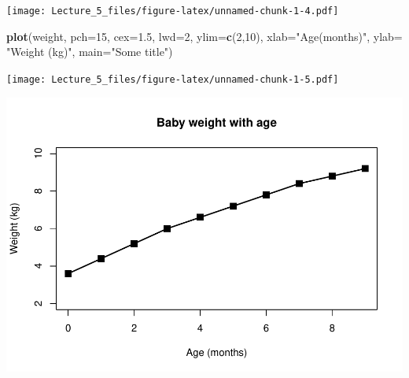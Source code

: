 \documentclass[]{article}
\newenvironment{Shaded}{\begin{snugshade}}{\end{snugshade}}
\newcommand{\KeywordTok}[1]{\textcolor[rgb]{0.13,0.29,0.53}{\textbf{#1}}}
\newcommand{\DataTypeTok}[1]{\textcolor[rgb]{0.13,0.29,0.53}{#1}}
\newcommand{\DecValTok}[1]{\textcolor[rgb]{0.00,0.00,0.81}{#1}}
\newcommand{\FloatTok}[1]{\textcolor[rgb]{0.00,0.00,0.81}{#1}}
\newcommand{\StringTok}[1]{\textcolor[rgb]{0.31,0.60,0.02}{#1}}
\newcommand{\OperatorTok}[1]{\textcolor[rgb]{0.81,0.36,0.00}{\textbf{#1}}}
\newcommand{\NormalTok}[1]{#1}
\begin{document}
\texttt{[image: Lecture\_5\_files/figure-latex/unnamed-chunk-1-4.pdf]}

\begin{Shaded}
\begin{Highlighting}[]
\KeywordTok{plot}\NormalTok{(weight, }\DataTypeTok{pch=}\DecValTok{15}\NormalTok{, }\DataTypeTok{cex=}\FloatTok{1.5}\NormalTok{, }\DataTypeTok{lwd=}\DecValTok{2}\NormalTok{, }\DataTypeTok{ylim=}\KeywordTok{c}\NormalTok{(}\DecValTok{2}\NormalTok{,}\DecValTok{10}\NormalTok{), }\DataTypeTok{xlab=}\StringTok{"Age(months)"}\NormalTok{, }\DataTypeTok{ylab=} \StringTok{"Weight (kg)"}\NormalTok{, }\DataTypeTok{main=}\StringTok{"Some title"}\NormalTok{)}
\end{Highlighting}
\end{Shaded}

\texttt{[image: Lecture\_5\_files/figure-latex/unnamed-chunk-1-5.pdf]}

\begin{Shaded}
\end{Shaded}

\includegraphics{Lecture_5_files/figure-latex/unnamed-chunk-1-6.pdf}
\end{document}
